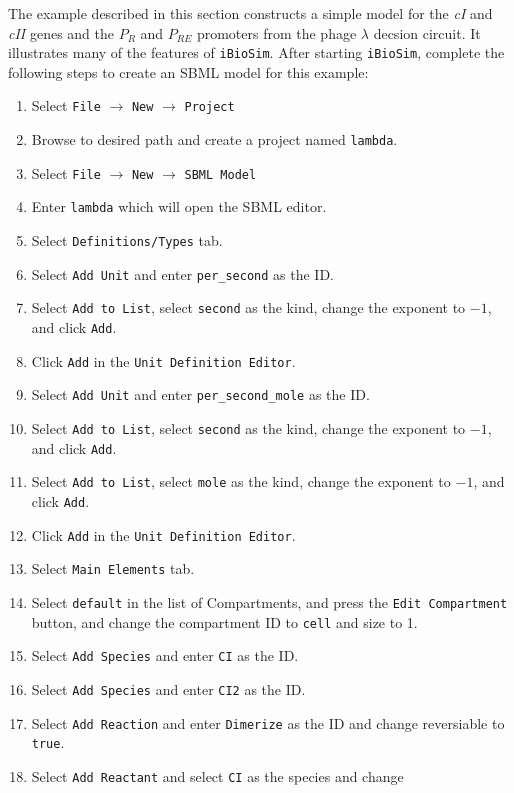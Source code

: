 \documentclass[titlepage,11pt]{article}
\begin{document}
\noindent
The example described in this section constructs a simple model for
the \emph{cI} and \emph{cII} genes and the $P_R$ and $P_{RE}$
promoters from the phage $\lambda$ decsion circuit.  It illustrates
many of the features of {\tt iBioSim}.
After starting {\tt iBioSim}, complete the following steps to create
an SBML model for this example:
\begin{enumerate}
\item Select {\tt File} $\rightarrow$ {\tt New} $\rightarrow$ {\tt Project}
\item Browse to desired path and create a project named {\tt lambda}.
\item Select {\tt File} $\rightarrow$ {\tt New} $\rightarrow$ {\tt SBML Model}
\item Enter {\tt lambda} which will open the SBML editor.
\item Select {\tt Definitions/Types} tab.
\item Select {\tt Add Unit} and enter {\tt per\_second} as the ID.
\item Select {\tt Add to List}, select {\tt second} as the kind, change
      the exponent to $-1$, and click {\tt Add}.
\item Click {\tt Add} in the {\tt Unit Definition Editor}.
\item Select {\tt Add Unit} and enter {\tt per\_second\_mole} as the ID.
\item Select {\tt Add to List}, select {\tt second} as the kind, change
      the exponent to $-1$, and click {\tt Add}.
\item Select {\tt Add to List}, select {\tt mole} as the kind, change
      the exponent to $-1$, and click {\tt Add}.
\item Click {\tt Add} in the {\tt Unit Definition Editor}.
\item Select {\tt Main Elements} tab.
\item Select {\tt default} in the list of Compartments, and press the
      {\tt Edit Compartment} button, and change the compartment ID to 
      {\tt cell} and size to 1.
\item Select {\tt Add Species} and enter {\tt CI} as the ID.
\item Select {\tt Add Species} and enter {\tt CI2} as the ID.
\item Select {\tt Add Reaction} and enter {\tt Dimerize} as the ID and
      change reversiable to {\tt true}.
\item Select {\tt Add Reactant} and select {\tt CI} as the species and change

\end{enumerate}
\end{document}
